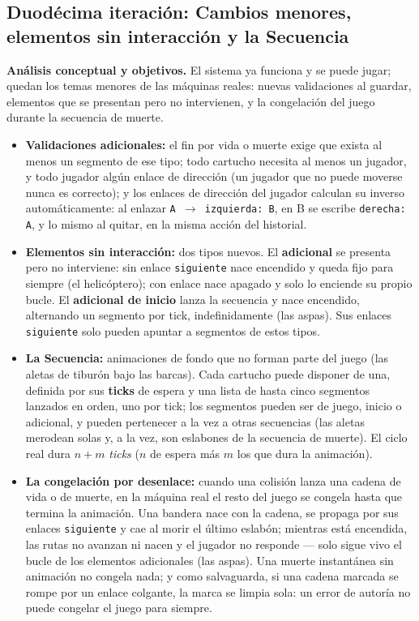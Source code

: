 \subsection{Duodécima iteración: Cambios menores, elementos sin interacción y la Secuencia}
\label{sec:F3Menores}

\textbf{Análisis conceptual y objetivos.} El sistema ya funciona y se
puede jugar; quedan los temas menores de las máquinas reales: nuevas
validaciones al guardar, elementos que se presentan pero no
intervienen, y la congelación del juego durante la secuencia de muerte.

\begin{itemize}
	\item \textbf{Validaciones adicionales:} el fin por vida o muerte exige
	que exista al menos un segmento de ese tipo; todo cartucho necesita al
	menos un jugador, y todo jugador algún enlace de dirección (un jugador
	que no puede moverse nunca es correcto); y los enlaces de dirección
	del jugador calculan su inverso automáticamente: al enlazar
	\texttt{A $\rightarrow$ izquierda: B}, en B se escribe
	\texttt{derecha: A}, y lo mismo al quitar, en la misma acción del
	historial.
	\item \textbf{Elementos sin interacción:} dos tipos nuevos. El
	\textbf{adicional} se presenta pero no interviene: sin enlace
	\texttt{siguiente} nace encendido y queda fijo para siempre (el
	helicóptero); con enlace nace apagado y solo lo enciende su propio
	bucle. El \textbf{adicional de inicio} lanza la secuencia y nace
	encendido, alternando un segmento por tick, indefinidamente (las
	aspas). Sus enlaces \texttt{siguiente} solo pueden apuntar a
	segmentos de estos tipos.
	\item \textbf{La Secuencia:} animaciones de fondo que no forman parte
	del juego (las aletas de tiburón bajo las barcas). Cada cartucho puede
	disponer de una, definida por sus \textbf{ticks} de espera y una lista
	de hasta cinco segmentos lanzados en orden, uno por tick; los
	segmentos pueden ser de juego, inicio o adicional, y pueden pertenecer
	a la vez a otras secuencias (las aletas merodean solas y, a la vez, son
	eslabones de la secuencia de muerte). El ciclo real dura $n + m$
	\textit{ticks} ($n$ de espera más $m$ los que dura la animación).
	\item \textbf{La congelación por desenlace:} cuando una colisión
	lanza una cadena de vida o de muerte, en la máquina real el resto del
	juego se congela hasta que termina la animación. Una bandera nace con
	la cadena, se propaga por sus enlaces \texttt{siguiente} y cae al morir
	el último eslabón; mientras está encendida, las rutas no avanzan ni
	nacen y el jugador no responde — solo sigue vivo el bucle de los
	elementos adicionales (las aspas). Una muerte instantánea sin animación
	no congela nada; y como salvaguarda, si una cadena marcada se rompe por
	un enlace colgante, la marca se limpia sola: un error de autoría no
	puede congelar el juego para siempre.
\end{itemize}


